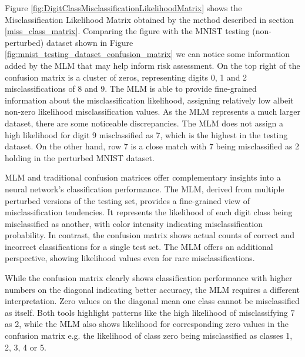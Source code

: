 Figure \ref{fig:DigitClassMisclassificationLikelihoodMatrix} shows the Misclassification Likelihood Matrix obtained by the method described in section \ref{miss_class_matrix}. Comparing the figure with the MNIST testing (non-perturbed) dataset shown in Figure \ref{fig:mnist_testing_dataset_confusion_matrix} we can notice some information added by the MLM that may help inform risk assessment. On the top right of the confusion matrix is a cluster of zeros, representing digits 0, 1 and 2 misclassifications of 8 and 9. The MLM is able to provide fine-grained information about the misclassification likelihood, assigning relatively low albeit non-zero likelihood misclassification values.
As the MLM represents a much larger dataset, there are some noticeable discrepancies. The MLM does not assign a high likelihood for digit 9 misclassified as 7, which is the highest in the testing dataset. On the other hand, row 7 is a close match with 7 being misclassified as 2 holding in the perturbed MNIST dataset.

MLM and traditional confusion matrices offer complementary insights into a neural network's classification performance. The MLM, derived from multiple perturbed versions of the testing set, provides a fine-grained view of misclassification tendencies. It represents the likelihood of each digit class being misclassified as another, with color intensity indicating misclassification probability. In contrast, the confusion matrix shows actual counts of correct and incorrect classifications for a single test set.
The MLM offers an additional perspective, showing likelihood values even for rare misclassifications.

While the confusion matrix clearly shows classification performance with higher numbers on the diagonal indicating better accuracy, the MLM requires a different interpretation. Zero values on the diagonal mean one class cannot be misclassified as itself. Both tools highlight patterns like the high likelihood of misclassifying 7 as 2, while the MLM also shows likelihood for corresponding zero values in the confusion matrix e.g. the likelihood of class zero being misclassified as classes 1, 2, 3, 4 or 5.



